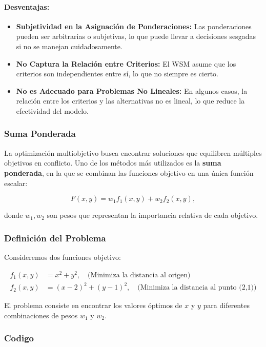 \documentclass[12pt]{article}
\begin{document}
\paragraph{Desventajas:}
\begin{itemize}
	\item \textbf{Subjetividad en la Asignación de Ponderaciones:} Las ponderaciones pueden ser arbitrarias o subjetivas, lo que puede llevar a decisiones sesgadas si no se manejan cuidadosamente.
	\item \textbf{No Captura la Relación entre Criterios:} El WSM asume que los criterios son independientes entre sí, lo que no siempre es cierto.
	\item \textbf{No es Adecuado para Problemas No Lineales:} En algunos casos, la relación entre los criterios y las alternativas no es lineal, lo que reduce la efectividad del modelo.
\end{itemize}

\subsubsection*{Suma Ponderada}
La optimización multiobjetivo busca encontrar soluciones que equilibren múltiples objetivos en conflicto. Uno de los métodos más utilizados es la \textbf{suma ponderada}, en la que se combinan las funciones objetivo en una única función escalar:

\begin{equation}
	F(x, y) = w_1 f_1(x, y) + w_2 f_2(x, y),
\end{equation}

donde \( w_1, w_2 \) son pesos que representan la importancia relativa de cada objetivo.

\subsubsection*{Definición del Problema}
Consideremos dos funciones objetivo:

\begin{align}
	f_1(x, y) &= x^2 + y^2,  \quad \text{(Minimiza la distancia al origen)} \\
	f_2(x, y) &= (x - 2)^2 + (y - 1)^2, \quad \text{(Minimiza la distancia al punto (2,1))}
\end{align}

El problema consiste en encontrar los valores óptimos de \( x \) y \( y \) para diferentes combinaciones de pesos \( w_1 \) y \( w_2 \).
\subsubsection*{Codigo}
\end{document}

